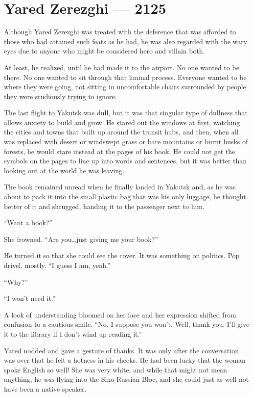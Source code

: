 \hypertarget{yared-zerezghi-2125}{%
\chapter{Yared Zerezghi — 2125}\label{yared-zerezghi-2125}}

Although Yared Zerezghi was treated with the deference that was afforded to those who had attained such feats as he had, he was also regarded with the wary eyes due to anyone who might be considered hero and villain both.

At least, he realized, until he had made it to the airport. No one wanted to be there. No one wanted to sit through that liminal process. Everyone wanted to be where they were going, not sitting in uncomfortable chairs surrounded by people they were studiously trying to ignore.

The last flight to Yakutsk was dull, but it was that singular type of dullness that allows anxiety to build and grow. He stared out the windows at first, watching the cities and towns that built up around the transit hubs, and then, when all was replaced with desert or windswept grass or bare mountains or burnt husks of forests, he would stare instead at the pages of his book. He could not get the symbols on the pages to line up into words and sentences, but it was better than looking out at the world he was leaving.

The book remained unread when he finally landed in Yakutsk and, as he was about to pack it into the small plastic bag that was his only luggage, he thought better of it and shrugged, handing it to the passenger next to him.

``Want a book?''

She frowned. ``Are you\ldots just giving me your book?''

He turned it so that she could see the cover. It was something on politics. Pop drivel, mostly. ``I guess I am, yeah.''

``Why?''

``I won't need it.''

A look of understanding bloomed on her face and her expression shifted from confusion to a cautious smile. ``No, I suppose you won't. Well, thank you. I'll give it to the library if I don't wind up reading it.''

Yared nodded and gave a gesture of thanks. It was only after the conversation was over that he felt a hotness in his cheeks. He had been lucky that the woman spoke English so well! She was very white, and while that might not mean anything, he \emph{was} flying into the Sino-Russian Bloc, and she could just as well not have been a native speaker.

